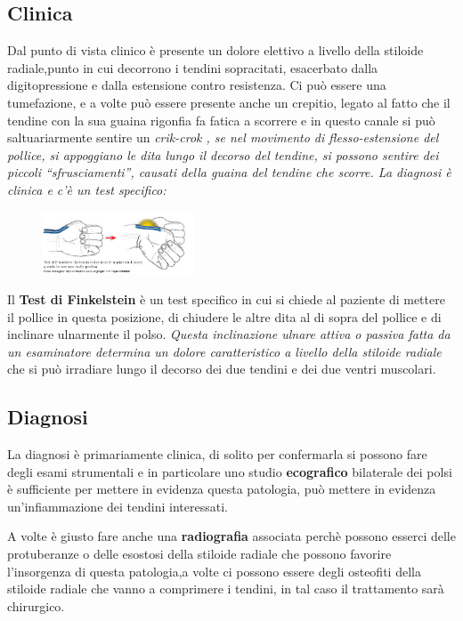 \subsection{Clinica}

Dal punto di vista clinico è presente un dolore elettivo a livello della stiloide radiale,punto in cui decorrono i tendini sopracitati, esacerbato dalla digitopressione e dalla estensione contro resistenza.
Ci può essere una tumefazione, e a volte può essere presente anche un crepitio, legato al fatto che il tendine con la sua guaina rigonfia fa fatica a scorrere e in questo canale si può saltuariarmente sentire un \emph{crik-crok , se nel movimento di flesso-estensione del pollice, si appoggiano le dita lungo il decorso del tendine, si possono sentire dei
piccoli ``sfrusciamenti'', causati della guaina del tendine che scorre. La diagnosi è clinica e c'è un test specifico: }

\begin{figure}[!ht]
\centering
\includegraphics[width=0.4\textwidth]{005/image5.jpeg}
\end{figure}

Il \textbf{Test di Finkelstein} è un test specifico in cui si chiede al paziente di mettere il pollice in questa posizione, di chiudere le altre dita al di sopra del pollice e di inclinare ulnarmente il polso. \emph{Questa inclinazione ulnare attiva o passiva fatta da un esaminatore determina un dolore caratteristico a livello della stiloide radiale} che si può irradiare lungo il decorso dei due tendini e dei due ventri muscolari.

\subsection{Diagnosi}

La diagnosi è primariamente clinica, di solito per confermarla si possono fare degli esami strumentali e in particolare uno studio \textbf{ecografico} bilaterale dei polsi è sufficiente per mettere in
evidenza questa patologia, può mettere in evidenza un'infiammazione dei tendini interessati.

A volte è giusto fare anche una \textbf{radiografia} associata perchè possono esserci delle protuberanze o delle esostosi della stiloide radiale che possono favorire l'insorgenza di questa patologia,a volte ci
possono essere degli osteofiti della stiloide radiale che vanno a comprimere i tendini, in tal caso il trattamento sarà chirurgico.


